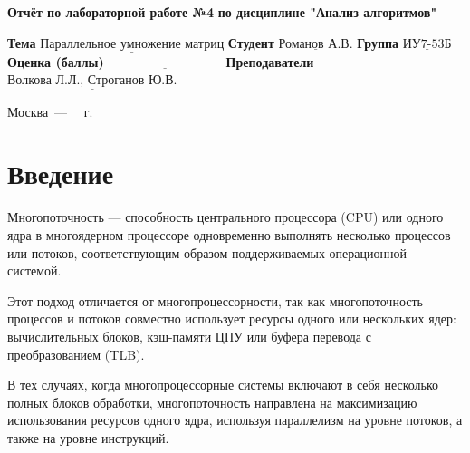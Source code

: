 \documentclass[12pt]{report}
\begin{document}
\begin{titlepage}
	
	\begin{center}
		\noindent\begin{minipage}{1.3\textwidth}\centering
			\Large\textbf{  Отчёт по лабораторной работе №4}\newline
			\textbf{по дисциплине "Анализ алгоритмов"}\newline\newline
		\end{minipage}
	\end{center}
	
	\noindent\textbf{Тема} $\underline{\text{Параллельное умножение матриц}}$\newline\newline
	\noindent\textbf{Студент} $\underline{\text{Романов А.В.}}$\newline\newline
	\noindent\textbf{Группа} $\underline{\text{ИУ7-53Б}}$\newline\newline
	\noindent\textbf{Оценка (баллы)} $\underline{\text{~~~~~~~~~~~~~~~~~~~~~~~~~~~}}$\newline\newline
	\noindent\textbf{Преподаватели} $\underline{\text{Волкова Л.Л., Строганов Ю.В.}}$\newline\newline\newline
	
	\begin{center}
		\vfill
		Москва~---~\the\year
		~г.
	\end{center}
\end{titlepage}


\tableofcontents

\newpage
\chapter*{Введение}

Многопоточность — способность центрального процессора (CPU) или одного ядра в многоядерном процессоре одновременно выполнять несколько процессов или потоков, соответствующим образом поддерживаемых операционной системой.

Этот подход отличается от многопроцессорности, так как многопоточность процессов и потоков совместно использует ресурсы одного или нескольких ядер: вычислительных блоков, кэш-памяти ЦПУ или буфера перевода с преобразованием (TLB).


В тех случаях, когда многопроцессорные системы включают в себя несколько полных блоков обработки, многопоточность направлена на максимизацию использования ресурсов одного ядра, используя параллелизм на уровне потоков, а также на уровне инструкций.
\end{document}
